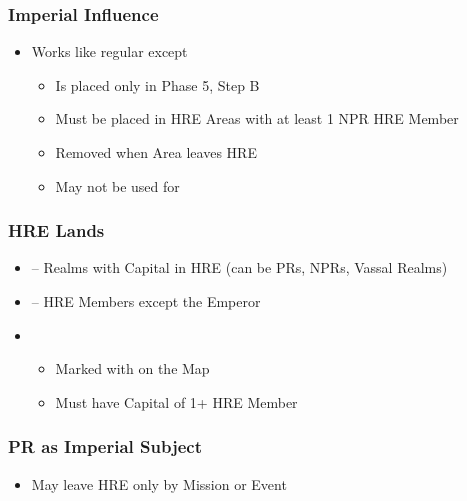 \documentclass[10pt]{article}
\begin{document}
\subsubsection*{Imperial Influence }
\begin{itemize}
	\item Works like regular \influence except
	\begin{itemize}
		\item Is placed only in Phase 5, Step B
		\item Must be placed in HRE Areas with at least 1 NPR HRE Member
		\item Removed when Area leaves HRE
		\item May not be used for 
	\end{itemize}
\end{itemize}

\subsubsection*{HRE Lands }
\begin{itemize}
	\item {} -- Realms with Capital in HRE (can be PRs, NPRs, Vassal Realms)
	\item {} -- HRE Members except the Emperor
	\item {}
	\begin{itemize}
		\item Marked with \authority on the Map
		\item Must have Capital of 1+ HRE Member
	\end{itemize}
\end{itemize}

\subsubsection*{PR as Imperial Subject }
\begin{itemize}
	\item May leave HRE only by Mission or Event
\end{itemize}
\end{document}
